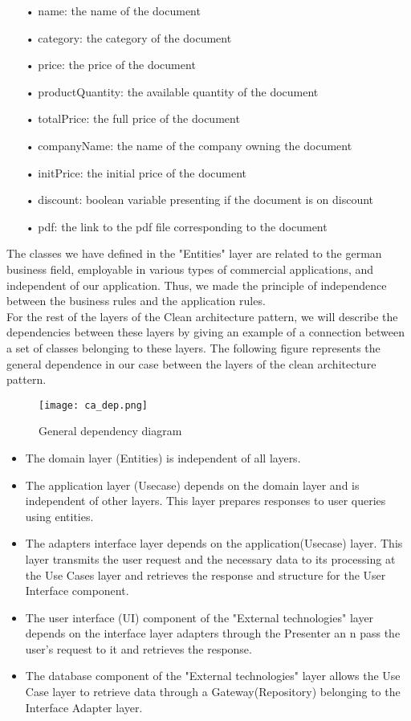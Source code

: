 \begin{itemize}
\begin{itemize}
\item[•] name: the name of the document
\item[•] category: the category of the document
\item[•] price: the price of the document
\item[•] productQuantity: the available quantity of the document
\item[•] totalPrice: the full price of the document
\item[•] companyName: the name of the company owning the document
\item[•] initPrice: the initial price of the document
\item[•] discount: boolean variable presenting if the document is on discount
\item[•] pdf: the link to the pdf file corresponding to the document
\end{itemize}
\end{itemize}
The classes we have defined in the "Entities" layer are related to the german business field, employable in various types of commercial applications, and
independent of our application. Thus, we made the
principle of independence between the business rules and the application rules.\\
For the rest of the layers of the Clean architecture pattern, we will describe
the dependencies between these layers by giving an example of a connection between a
set of classes belonging to these layers.
The following figure represents the general dependence in our case between the
layers of the clean architecture pattern.
\begin{figure}[H]%
    \center   
    \texttt{[image: ca\_dep.png]}
    \caption{General dependency diagram}
\end{figure}
\begin{itemize}
\item The domain layer (Entities) is independent of all layers.
\item The application layer (Usecase) depends on the domain layer and is independent of other layers. This layer prepares responses to
user queries using entities.
\item The adapters interface layer depends on the application(Usecase) layer.
This layer transmits the user request and the necessary data
to its processing at the Use Cases layer and retrieves the response and structure
for the User Interface component.
\item The user interface (UI) component of the "External technologies" layer
depends on the interface layer adapters through the Presenter an n
pass the user's request to it and retrieves the response.
\item The database component of the "External technologies" layer
allows the Use Case layer to retrieve data through a
Gateway(Repository) belonging to the Interface Adapter layer.

\end{itemize}
